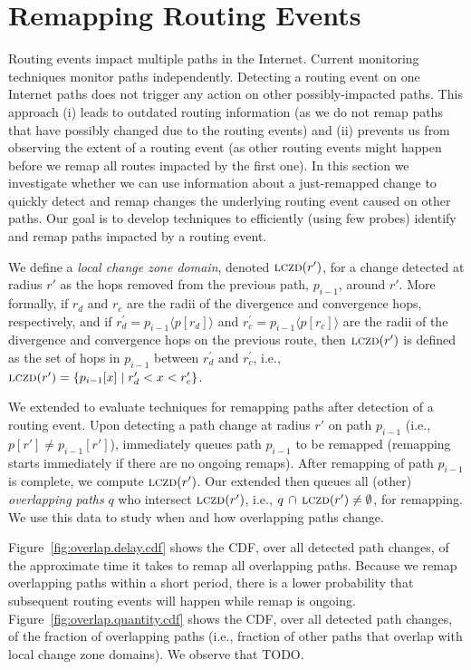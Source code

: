 \section{Remapping Routing Events}
\label{sec:patching}

Routing events impact multiple paths in the Internet. Current
monitoring techniques monitor paths independently. Detecting
a routing event on one Internet paths does not trigger any action on
other possibly-impacted paths.  This approach (i) leads to outdated
routing information (as we do not remap paths that have possibly
changed due to the routing events) and (ii) prevents us from
observing the extent of a routing event (as other routing events
might happen before we remap all routes impacted by the first one).
In this section we investigate whether we can use information about
a just-remapped change to quickly detect and remap changes the
underlying routing event caused on other paths.  Our goal is to
develop techniques to efficiently (using few probes) identify and
remap paths impacted by a routing event.

\newcommand{\lczd}{\ensuremath\mathrm{\textsc{lczd}}}

We define a \emph{local change zone domain}, denoted $\lczd(r')$,
for a change detected at radius $r'$ as the hops removed from the
previous path, $p_{i-1}$, around $r'$. More formally, if $r_d$ and
$r_c$ are the radii of the divergence and convergence hops,
respectively, and if $r^\prime_d = p_{i-1}\langle p[r_d]\rangle$ and
$r^\prime_c = p_{i-1}\langle p[r_c]\rangle$ are the radii of the
divergence and convergence hops on the previous route, then
$\lczd(r')$ is defined as the set of hops in $p_{i-1}$ between
$r^\prime_d$ and $r^\prime_c$, i.e., $\lczd(r') = \{p_{i-1}[x]
\mid{} r^\prime_d < x < r^\prime_c\}$.

We extended \dtrack{} to evaluate techniques for remapping paths
after detection of a routing event.  Upon detecting a path change at
radius $r'$ on path $p_{i-1}$ (i.e., $p[r'] \ne p_{i-1}[r']$),
\dtrack{} immediately queues path $p_{i-1}$ to be remapped
(remapping starts immediately if there are no ongoing remaps).
After remapping of path $p_{i-1}$ is complete, we compute
$\lczd(r')$.  Our extended \dtrack{} then queues all (other)
\emph{overlapping paths} $q$ who intersect $\lczd(r')$, i.e., $q\,
\cap\,\lczd(r') \ne \emptyset$, for remapping.  We use this data to
study when and how overlapping paths change.

Figure~\ref{fig:overlap.delay.cdf} shows the CDF, over all detected
path changes, of the approximate time it takes to remap all
overlapping paths.  Because we remap overlapping paths within
a short period, there is a lower probability that subsequent routing
events will happen while remap is ongoing.
Figure~\ref{fig:overlap.quantity.cdf} shows the CDF, over all
detected path changes, of the fraction of overlapping paths (i.e.,
fraction of other paths that overlap with local change zone
domains).  We observe that TODO.

